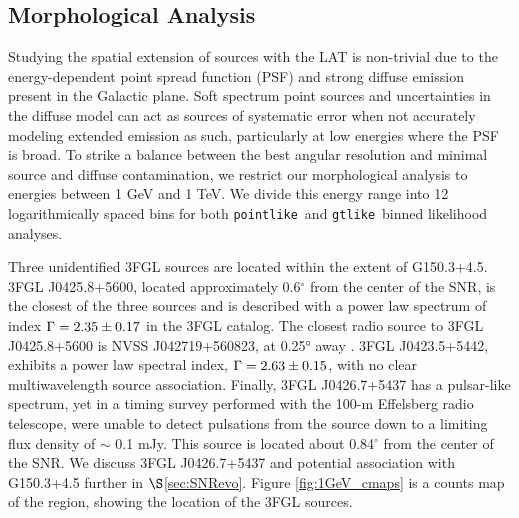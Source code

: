 \documentclass[iop]{emulateapj}
\newcommand{\ptlike}{{\tt pointlike}}
\newcommand{\gtlike}{{\tt gtlike}}
\newcommand{\Gone}{G150.3+4.5}
\newcommand{\psrLike}{3FGL J0426.7+5437}
\begin{document}
\subsection{Morphological Analysis}\label{sec:LATmorph}
Studying the spatial extension of sources with the LAT is non-trivial due to the energy-dependent point spread function (PSF) and strong diffuse emission present in the Galactic plane. Soft spectrum point sources and uncertainties in the diffuse model can act as sources of systematic error when not accurately modeling extended emission as such, particularly at low energies where the PSF is broad. To strike a balance between the best angular resolution and minimal source and diffuse contamination, we restrict our morphological analysis to energies between 1 GeV and 1 TeV. We divide this energy range into 12 logarithmically spaced bins for both \ptlike~and \gtlike~binned likelihood analyses. 

Three  unidentified 3FGL sources are located within the extent of \Gone. 3FGL J0425.8+5600, located approximately 0.6$^\circ$ from the center of the SNR, is the closest of the three sources and is described with a power law spectrum of index ${\rm \Gamma = 2.35\pm 0.17}$  in the 3FGL catalog. The closest radio source to 3FGL J0425.8+5600 is NVSS J042719+560823, at 0.25° away \citep{Condon98}. 3FGL J0423.5+5442, exhibits a power law spectral index, ${\rm \Gamma = 2.63\pm 0.15}$, with no clear multiwavelength source association. Finally, \psrLike{} has a pulsar-like spectrum, yet in a timing survey performed with the 100-m  Effelsberg radio telescope, \cite{Barr13} were unable to detect pulsations from the source down to a limiting flux density of $\sim$ 0.1 mJy. This source is located about 0.84$^{\circ}$ from the center of the SNR. We discuss \psrLike{} and potential association with \Gone{} further in $\S$\ref{sec:SNRevo}. Figure \ref{fig:1GeV_cmaps} is a counts map of the region, showing the location of the 3FGL sources.
\end{document}
